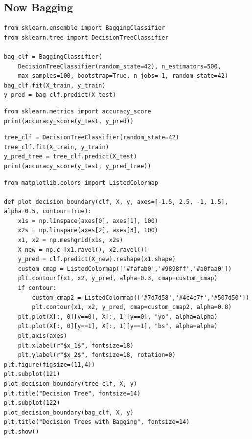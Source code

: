 \documentclass[%
oneside,                 %
final,                   %
10pt]{article}
\begin{document}
\subsection*{Now Bagging}

\begin{verbatim}
from sklearn.ensemble import BaggingClassifier
from sklearn.tree import DecisionTreeClassifier

bag_clf = BaggingClassifier(
    DecisionTreeClassifier(random_state=42), n_estimators=500,
    max_samples=100, bootstrap=True, n_jobs=-1, random_state=42)
bag_clf.fit(X_train, y_train)
y_pred = bag_clf.predict(X_test)
\end{verbatim}


\begin{verbatim}
from sklearn.metrics import accuracy_score
print(accuracy_score(y_test, y_pred))
\end{verbatim}

\begin{verbatim}
tree_clf = DecisionTreeClassifier(random_state=42)
tree_clf.fit(X_train, y_train)
y_pred_tree = tree_clf.predict(X_test)
print(accuracy_score(y_test, y_pred_tree))
\end{verbatim}

\begin{verbatim}
from matplotlib.colors import ListedColormap

def plot_decision_boundary(clf, X, y, axes=[-1.5, 2.5, -1, 1.5], alpha=0.5, contour=True):
    x1s = np.linspace(axes[0], axes[1], 100)
    x2s = np.linspace(axes[2], axes[3], 100)
    x1, x2 = np.meshgrid(x1s, x2s)
    X_new = np.c_[x1.ravel(), x2.ravel()]
    y_pred = clf.predict(X_new).reshape(x1.shape)
    custom_cmap = ListedColormap(['#fafab0','#9898ff','#a0faa0'])
    plt.contourf(x1, x2, y_pred, alpha=0.3, cmap=custom_cmap)
    if contour:
        custom_cmap2 = ListedColormap(['#7d7d58','#4c4c7f','#507d50'])
        plt.contour(x1, x2, y_pred, cmap=custom_cmap2, alpha=0.8)
    plt.plot(X[:, 0][y==0], X[:, 1][y==0], "yo", alpha=alpha)
    plt.plot(X[:, 0][y==1], X[:, 1][y==1], "bs", alpha=alpha)
    plt.axis(axes)
    plt.xlabel(r"$x_1$", fontsize=18)
    plt.ylabel(r"$x_2$", fontsize=18, rotation=0)
plt.figure(figsize=(11,4))
plt.subplot(121)
plot_decision_boundary(tree_clf, X, y)
plt.title("Decision Tree", fontsize=14)
plt.subplot(122)
plot_decision_boundary(bag_clf, X, y)
plt.title("Decision Trees with Bagging", fontsize=14)
plt.show()
\end{verbatim}
\end{document}
